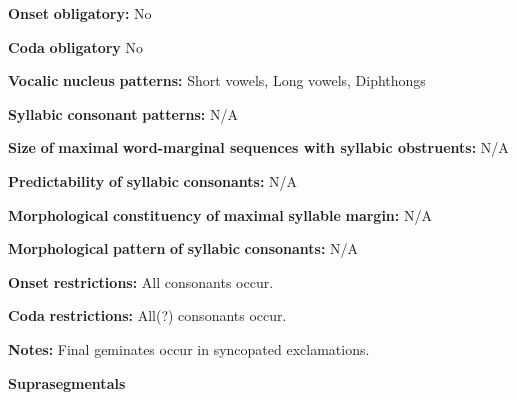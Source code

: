 \begin{styleBody}
\textbf{Onset} \textbf{obligatory:} No
\end{styleBody}

\begin{styleBody}
\textbf{Coda} \textbf{obligatory} No
\end{styleBody}

\begin{styleBody}
\textbf{Vocalic} \textbf{nucleus} \textbf{patterns:} Short vowels, Long vowels, Diphthongs
\end{styleBody}

\begin{styleBody}
\textbf{Syllabic} \textbf{consonant} \textbf{patterns:} N/A
\end{styleBody}

\begin{styleBody}
\textbf{Size} \textbf{of} \textbf{maximal} \textbf{word{}-marginal sequences with syllabic obstruents:} N/A
\end{styleBody}

\begin{styleBody}
\textbf{Predictability} \textbf{of} \textbf{syllabic} \textbf{consonants:} N/A
\end{styleBody}

\begin{styleBody}
\textbf{Morphological} \textbf{constituency} \textbf{of} \textbf{maximal} \textbf{syllable} \textbf{margin:} N/A
\end{styleBody}

\begin{styleBody}
\textbf{Morphological} \textbf{pattern} \textbf{of} \textbf{syllabic} \textbf{consonants:} N/A
\end{styleBody}

\begin{styleBody}
\textbf{Onset} \textbf{restrictions:} All consonants occur.
\end{styleBody}

\begin{styleBody}
\textbf{Coda} \textbf{restrictions:} All(?) consonants occur.
\end{styleBody}

\begin{styleBody}
\textbf{Notes:} Final geminates occur in syncopated exclamations.
\end{styleBody}

\begin{styleBody}
\textbf{Suprasegmentals}
\end{styleBody}

